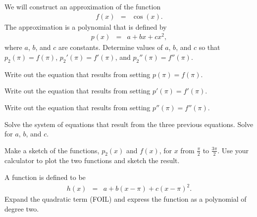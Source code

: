 \begin{problem}
\item We will construct an approximation of the function
  \begin{eqnarray*}
    f(x) & = & \cos(x).
  \end{eqnarray*}
  The approximation is a polynomial that is defined by
  \begin{eqnarray*}
    p(x) & = & a + b x + c x^2,
  \end{eqnarray*}
  where $a$, $b$, and $c$ are constants.
  Determine values of $a$, $b$, and $c$ so that $p_2(\pi)=f(\pi)$,
  $p_2'(\pi)=f'(\pi)$, and $p_2''(\pi)=f''(\pi)$.
\begin{subproblem}
\item Write out the equation that results from setting $p(\pi)=f(\pi)$.
\vfill
\item Write out the equation that results from setting $p'(\pi)=f'(\pi)$.
\vfill
\item Write out the equation that results from setting $p''(\pi)=f''(\pi)$.
\vfill
\item Solve the system of equations that result from the three previous equations. Solve for $a$, $b$, and $c$.
\vfill
\vfill
\end{subproblem}

  \clearpage

\item Make a sketch of the functions, $p_2(x)$ and $f(x)$, for $x$ from $\frac{\pi}{2}$ to
  $\frac{3\pi}{2}$. Use your calculator to plot the two functions and
  sketch the result.

  \vfill

\item A function is defined to be
  \begin{eqnarray*}
    h(x) & = & a + b (x-\pi) + c(x-\pi)^2.
  \end{eqnarray*}
  Expand the quadratic term (FOIL) and express the function as a
  polynomial of degree two.

  \vspace{5em}


\end{problem}


